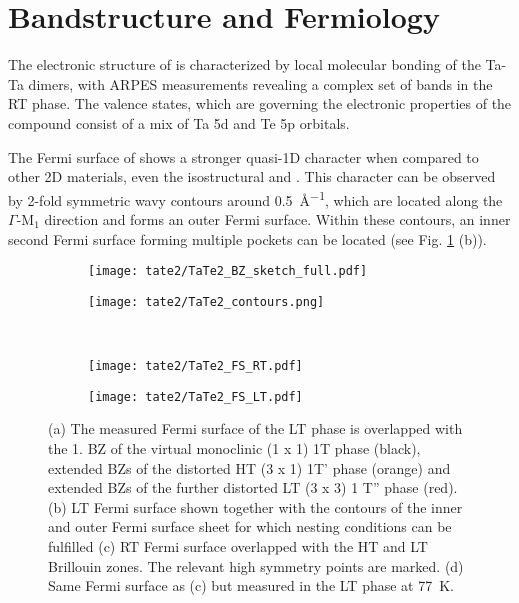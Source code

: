 \section{Bandstructure and Fermiology}

The electronic structure of  is characterized by local molecular bonding of the Ta-Ta dimers, with ARPES measurements revealing a complex set of bands in the RT phase.
The valence states, which are governing the electronic properties of the compound consist of a mix of Ta 5d and Te 5p orbitals. \cite{mitsuishi_unveiling_2024}

The Fermi surface of  shows a stronger quasi-1D character when compared to other 2D materials, even the isostructural  and .
This character can be observed by 2-fold symmetric wavy contours around \qty{0.5}{\angstrom^{-1}}, which are located along the $\Gamma$-M$_1$ direction and forms an outer Fermi surface.
Within these contours, an inner second Fermi surface forming multiple pockets can be located (see Fig. \ref{fig:TaTe_FS} (b)).

\begin{figure}[t!]
	\centering
	\begin{subfigure}[b]{0.49\textwidth}
		\texttt{[image: tate2/TaTe2\_BZ\_sketch\_full.pdf]}
		\caption{}
	\end{subfigure}
	\hfill
	\begin{subfigure}[b]{0.49\textwidth}
		\texttt{[image: tate2/TaTe2\_contours.png]}
		\caption{}
	\end{subfigure}
	\\
	\begin{subfigure}[b]{0.49\textwidth}
		\texttt{[image: tate2/TaTe2\_FS\_RT.pdf]}
		\caption{}
	\end{subfigure}
	\hfill
	\begin{subfigure}[b]{0.49\textwidth}
		\texttt{[image: tate2/TaTe2\_FS\_LT.pdf]}
		\caption{}
	\end{subfigure}
	\caption{(a) The measured Fermi surface of the LT phase is overlapped with the 1. BZ of the virtual monoclinic (1 x 1) 1T phase (black), extended BZs of the distorted HT (3 x 1) 1T' phase (orange) and extended BZs of the further distorted LT (3 x 3) 1 T'' phase (red). (b) LT Fermi surface shown together with the contours of the inner and outer Fermi surface sheet for which nesting conditions can be fulfilled (c) RT Fermi surface overlapped with the HT and LT Brillouin zones. The relevant high symmetry points are marked. (d) Same Fermi surface as (c) but measured in the LT phase at \qty{77}{\kelvin}.}
	\label{fig:TaTe_FS}
\end{figure}

